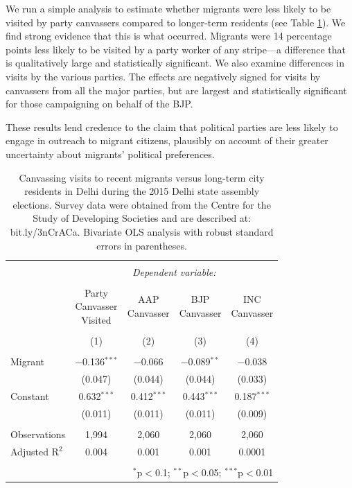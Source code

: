 \documentclass[
  11.5pt,
]{article}
\begin{document}
We run a simple analysis to estimate whether migrants were less likely
to be visited by party canvassers compared to longer-term residents (see
Table \ref{tab:party_canvass}). We find strong evidence that this is
what occurred. Migrants were 14 percentage points less likely to be
visited by a party worker of any stripe---a difference that is
qualitatively large and statistically significant. We also examine
differences in visits by the various parties. The effects are negatively
signed for visits by canvassers from all the major parties, but are
largest and statistically significant for those campaigning on behalf of
the BJP.

These results lend credence to the claim that political parties are less
likely to engage in outreach to migrant citizens, plausibly on account
of their greater uncertainty about migrants' political preferences.

\begin{table}[!htbp] \centering 
  \caption{Canvassing visits to recent migrants versus long-term city residents in Delhi during the 2015 Delhi state assembly elections. Survey data were obtained from the Centre for the Study of Developing Societies and are described at: bit.ly/3nCrACa. Bivariate OLS analysis with robust standard errors in parentheses.} 
  \label{tab:party_canvass} 
\small 
\begin{tabular}{@{\extracolsep{5pt}}lcccc} 
\\[-1.8ex]\hline 
\hline \\[-1.8ex] 
 & \multicolumn{4}{c}{\textit{Dependent variable:}} \\ 
\cline{2-5} 
\\[-1.8ex] & \shortstack{Party \\ Canvasser \\ Visited} & \shortstack{AAP \\ Canvasser} & \shortstack{BJP \\ Canvasser} & \shortstack{INC \\ Canvasser} \\ 
\\[-1.8ex] & (1) & (2) & (3) & (4)\\ 
\hline \\[-1.8ex] 
 Migrant & $-$0.136$^{***}$ & $-$0.066 & $-$0.089$^{**}$ & $-$0.038 \\ 
  & (0.047) & (0.044) & (0.044) & (0.033) \\ 
  Constant & 0.632$^{***}$ & 0.412$^{***}$ & 0.443$^{***}$ & 0.187$^{***}$ \\ 
  & (0.011) & (0.011) & (0.011) & (0.009) \\ 
 \hline \\[-1.8ex] 
Observations & 1,994 & 2,060 & 2,060 & 2,060 \\ 
Adjusted R$^{2}$ & 0.004 & 0.001 & 0.001 & 0.0001 \\ 
\hline 
\hline \\[-1.8ex] 
\multicolumn{5}{r}{$^{*}$p$<$0.1; $^{**}$p$<$0.05; $^{***}$p$<$0.01} \\ 
\end{tabular} 
\end{table}
\end{document}
